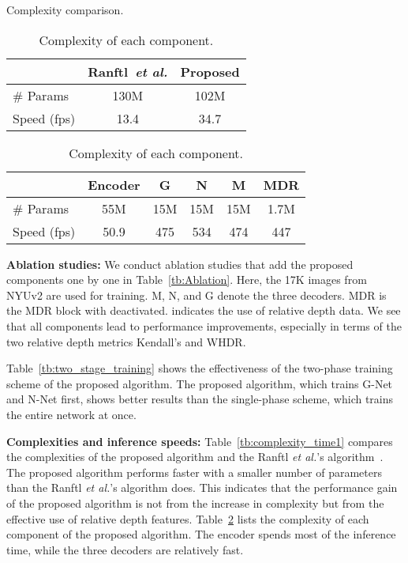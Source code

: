 \documentclass[runningheads]{llncs}
\newcommand{\etal}{\textit{et al.}}
\begin{document}
\begin{table}[h!]
 \begin{minipage}{0.44\linewidth}
    \scriptsize
    \centering
    \addtolength{\tabcolsep}{3pt}
    \renewcommand{\arraystretch}{1.1}
    \caption{Complexity comparison.}\begin{tabular}[t]{l|cc}
        \toprule
        & Ranftl~\etal \cite{ranftl2021vision} & Proposed\\\midrule
        \# Params & 130M & 102M  \\
        Speed (fps) & 13.4 & 34.7  \\
        \bottomrule
    \end{tabular}
    \label{tb:complexity_time1}
 \end{minipage} \hspace{0.3cm}
 \begin{minipage}{0.54\linewidth}
    \scriptsize
    \addtolength{\tabcolsep}{2.4pt}
    \renewcommand{\arraystretch}{1.1}
    \caption{Complexity of each component.}
    \centering
    \begin{tabular}[t]{l|ccccc}
        \toprule
        & Encoder & G  & N & M & MDR\\ \midrule
        \# Params & 55M  & 15M & 15M & 15M & 1.7M \\
        Speed (fps) & 50.9 & 475 & 534 & 474 & 447\\
        \bottomrule
    \end{tabular}
    \label{tb:complexity_time2}
 \end{minipage}
\end{table}

{\noindent \bf Ablation studies:}
We conduct ablation studies that add the proposed components one by one in Table~\ref{tb:Ablation}. Here, the 17K images from NYUv2 are used for training. M, N, and G denote the three decoders. MDR is the MDR block with  deactivated.  indicates the use of relative depth data. We see that all components lead to performance improvements, especially in terms of the two relative depth metrics Kendall's  and WHDR.

Table~\ref{tb:two_stage_training} shows the effectiveness of the two-phase training scheme of the proposed algorithm. The proposed algorithm, which trains G-Net and N-Net first, shows better results than the single-phase scheme, which trains the entire network at once.

{\noindent \bf Complexities and inference speeds:}
Table~\ref{tb:complexity_time1} compares the complexities of the proposed algorithm and the Ranftl \etal's algorithm~\cite{ranftl2021vision}. The proposed algorithm performs faster with a smaller number of parameters than the Ranftl \etal's algorithm \cite{ranftl2021vision} does. This indicates that the performance gain of the proposed algorithm is not from the increase in complexity but from the effective use of relative depth features. Table~\ref{tb:complexity_time2} lists the complexity of each component of the proposed algorithm. The encoder spends most of the inference time, while the three decoders are relatively fast.
\end{document}

